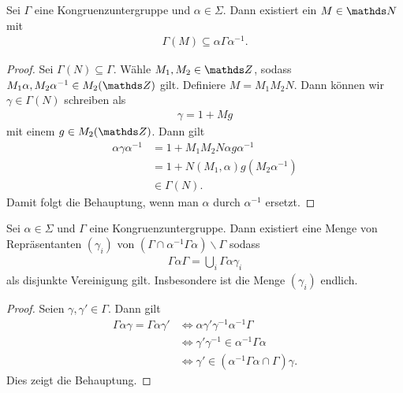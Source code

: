 \begin{prop}
Sei $\Gamma$ eine Kongruenzuntergruppe und $\alpha \in \Sigma$.
Dann existiert ein $M \in \N$ mit
\begin{align*}
\Gamma(M)\subseteq \alpha \Gamma \alpha^{-1}.
\end{align*}
\end{prop}
\begin{proof}
Sei $\Gamma(N)\subseteq \Gamma$.
Wähle $M_1,M_2 \in \Z$, sodass $M_1\alpha,M_2\alpha^{-1} \in M_2(\Z)$ gilt.
Definiere $M=M_1M_2N$.
Dann können wir $\gamma \in \Gamma(N)$ schreiben als
\begin{align*}
\gamma=1+Mg
\end{align*}
mit einem $g \in M_2(\Z)$.
Dann gilt
\begin{align*}
\alpha \gamma \alpha^{-1} &=1+M_1M_2N \alpha g\alpha^{-1}\\
&=1+N(M_1,\alpha)g (M_2\alpha^{-1})\\
&\in \Gamma(N).
\end{align*}
Damit folgt die Behauptung, wenn man $\alpha$ durch $\alpha^{-1}$ ersetzt.
\end{proof}


\begin{prop}
Sei $\alpha \in \Sigma$ und $\Gamma$ eine Kongruenzuntergruppe. Dann existiert eine Menge von Repräsentanten $(\gamma_i)$ von
$(\Gamma \cap \alpha^{-1} \Gamma \alpha)\backslash \Gamma$ sodass
\begin{align*}
\Gamma \alpha \Gamma =\bigcup_{i} \Gamma \alpha \gamma_i
\end{align*}
als disjunkte Vereinigung gilt.
Insbesondere ist die Menge $(\gamma_i)$ endlich.
\end{prop}
\begin{proof}
Seien $\gamma,\gamma'\in \Gamma$.
Dann gilt
\begin{align*}
\Gamma \alpha \gamma =\Gamma\alpha \gamma'&\Leftrightarrow \alpha \gamma' \gamma^{-1} \alpha^{-1} \Gamma\\
&\Leftrightarrow \gamma'\gamma^{-1} \in \alpha^{-1} \Gamma \alpha\\
&\Leftrightarrow \gamma' \in (\alpha^{-1} \Gamma \alpha \cap \Gamma)\gamma.
\end{align*}
Dies zeigt die Behauptung.
\end{proof}

